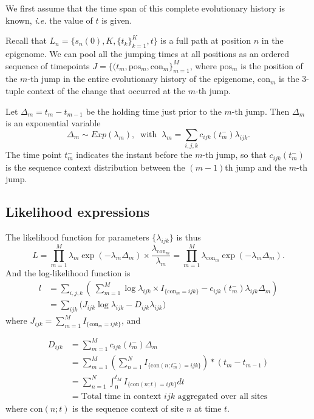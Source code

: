 \documentclass[11pt]{article}
\newcommand{\context}{\ensuremath{\mathrm{con}}}
\newcommand{\psn}{\ensuremath{\mathrm{pos}}}
\begin{document}
We first assume that the time span of this complete evolutionary
history is known, \textit{i.e.} the value of $t$ is given.

Recall that $L_n = \{s_n(0), K, \{t_k\}_{k=1}^K, t\}$ is a full path
at position $n$ in the epigenome. We can pool all the jumping times at
all positions as an ordered sequence of timepoints $J = \{(t_m, \psn{}_m,
\context{}_m\}_{m=1}^{M}$, where $\psn{}_m$ is the position of the
$m$-th jump in the entire evolutionary history of the epigenome,
$\context{}_m$ is the 3-tuple context of the change that
occurred at the $m$-th jump.

Let $\Delta_m = t_m - t_{m-1}$ be the holding time just prior to the
$m$-th jump. Then $\Delta_m$ is an exponential variable
\[
\Delta_m \sim \mathit{Exp}(\lambda_m), ~\text{ with }~
\lambda_m = \sum_{i,j,k}c_{ijk}(t_m^-)\lambda_{ijk}.
\]
The time point $t_m^-$ indicates the instant before the $m$-th jump,
so that $c_{ijk}(t_m^-)$ is the sequence context distribution between
the $(m-1)$th jump and the $m$-th jump.

\subsection{Likelihood expressions}

The likelihood function for parameters $\{\lambda_{ijk}\}$ is thus
\begin{equation}\label{eqn:lik}
L = \prod\limits_{m=1}^{M} \lambda_m \exp(-\lambda_m\Delta_m) \times \frac{\lambda_{\context{}_m}}{\lambda_m}
=\prod\limits_{m=1}^{M}\lambda_{\context{}_m}\exp(-\lambda_m\Delta_m).
\end{equation}
And the log-likelihood function is
\begin{equation}\label{eqn:loglik1}
\begin{aligned}
l & = \sum_{i,j,k} \left(~
\sum_{m=1}^M\log\lambda_{ijk}\times I_{\{\context{}_m = ijk\}} - c_{ijk}(t_m^-)\lambda_{ijk}\Delta_m\right) \\
& = \sum\limits_{ijk} \big(J_{ijk}\log\lambda_{ijk} - D_{ijk}\lambda_{ijk} \big)
\end{aligned}
\end{equation}
where $J_{ijk} = \sum_{m=1}^M I_{\{\context{}_m = ijk\}}$, and

\begin{equation}\label{eqn:Dijk}
\begin{aligned}
D_{ijk} &= \sum_{m=1}^Mc_{ijk}(t_m^-)\Delta_m \\
& = \sum_{m=1}^M (\sum_{n=1}^{N} I_{\{\text{con}(n; t_m^-) = ijk\}})*(t_m - t_{m-1}) \\
& = \sum_{n=1}^{N}\int_{0}^{t_M} I_{\{\text{con}(n;t) = ijk\}} dt\\
& = \text{Total time in context $ijk$ aggregated over all sites}
\end{aligned}
\end{equation}
where $\text{con}(n; t)$ is the sequence context of site $n$ at time $t$.
\end{document}
